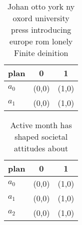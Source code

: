 \documentclass[a4paper]{article}
\begin{document}
\begin{table}
\begin{adjustbox}{width=0.8\columnwidth}
\begin{tabular}{|l|l|l|}
\hline
\textbf{plan} & \multicolumn{1}{c|}{\textbf{0}} & \multicolumn{1}{c|}{\textbf{1}} \\ \hline
\textbf{$a_0$}  & (0,0) & (1,0) \\ \hline
\textbf{$a_1$}  & (0,0) & (1,0) \\ \hline
\end{tabular}
\end{adjustbox}
\caption{Johan otto york ny oxord university press introducing europe rom lonely Finite deinition 
}
\end{table}

\begin{table}
\begin{adjustbox}{width=0.7\columnwidth}
\begin{tabular}{|l|l|l|}
\hline
\textbf{plan} & \multicolumn{1}{c|}{\textbf{0}} & \multicolumn{1}{c|}{\textbf{1}} \\ \hline
\textbf{$a_0$}  & (0,0) & (1,0) \\ \hline
\textbf{$a_1$}  & (0,0) & (1,0) \\ \hline
\textbf{$a_2$}  & (0,0) & (1,0) \\ \hline
\end{tabular}
\end{adjustbox}
\caption{Active month has shaped societal attitudes about 
}
\end{table}
\end{document}
